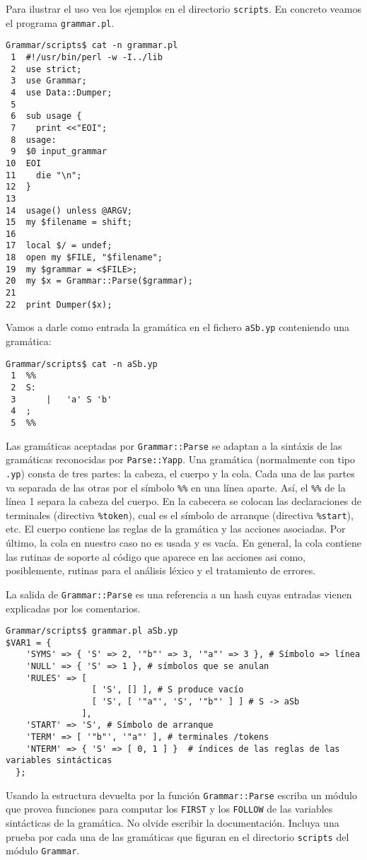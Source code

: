Para ilustrar el uso vea los ejemplos en el directorio \verb|scripts|.
En concreto veamos el programa \verb|grammar.pl|.
\begin{verbatim}
Grammar/scripts$ cat -n grammar.pl
 1  #!/usr/bin/perl -w -I../lib
 2  use strict;
 3  use Grammar;
 4  use Data::Dumper;
 5
 6  sub usage {
 7    print <<"EOI";
 8  usage:
 9  $0 input_grammar
10  EOI
11    die "\n";
12  }
13
14  usage() unless @ARGV;
15  my $filename = shift;
16
17  local $/ = undef;
18  open my $FILE, "$filename";
19  my $grammar = <$FILE>;
20  my $x = Grammar::Parse($grammar);
21
22  print Dumper($x);
\end{verbatim}
Vamos a darle como entrada la gramática en el fichero \verb|aSb.yp|
conteniendo una gramática:
\begin{verbatim}
Grammar/scripts$ cat -n aSb.yp
 1  %%
 2  S:
 3      |   'a' S 'b'
 4  ;
 5  %%
\end{verbatim}

Las gramáticas aceptadas por \verb|Grammar::Parse| se adaptan a la sintáxis de
las gramáticas reconocidas por \verb|Parse::Yapp|.
Una gramática (normalmente con tipo  \verb|.yp|) consta de tres partes: la cabeza, el cuerpo
y la cola. Cada una de las partes va separada de las otras por el
símbolo \verb|%%| en una línea aparte. Así, el \verb|%%| de la línea 1
separa la cabeza del cuerpo. En la cabecera se colocan 
las declaraciones de terminales (directiva \verb|%token|), 
cual es el símbolo de arranque (directiva \verb|%start|), etc.
El cuerpo contiene las reglas de la gramática y
las acciones asociadas. Por último, la cola  en nuestro caso no es
usada y es vacía. En general, la cola 
contiene las rutinas de soporte al código que aparece en las acciones 
asi como, posiblemente, rutinas para el análisis léxico 
y el tratamiento de errores. 

La salida de \verb|Grammar::Parse| es una referencia a un hash cuyas entradas
vienen explicadas por los comentarios.
\begin{verbatim}
Grammar/scripts$ grammar.pl aSb.yp
$VAR1 = {
    'SYMS' => { 'S' => 2, '"b"' => 3, '"a"' => 3 }, # Símbolo => línea
    'NULL' => { 'S' => 1 }, # símbolos que se anulan
    'RULES' => [
                 [ 'S', [] ], # S produce vacío
                 [ 'S', [ '"a"', 'S', '"b"' ] ] # S -> aSb
               ],
    'START' => 'S', # Símbolo de arranque
    'TERM' => [ '"b"', '"a"' ], # terminales /tokens
    'NTERM' => { 'S' => [ 0, 1 ] }  # índices de las reglas de las variables sintácticas
  };
\end{verbatim}
Usando la estructura devuelta por la función \verb|Grammar::Parse| escriba un módulo
que provea funciones para computar los \verb|FIRST| y los \verb|FOLLOW| de las variables
sintácticas de la gramática. No olvide escribir la documentación. 
Incluya una prueba por cada una de las gramáticas que figuran en el directorio \verb|scripts|
del módulo \verb|Grammar|.

